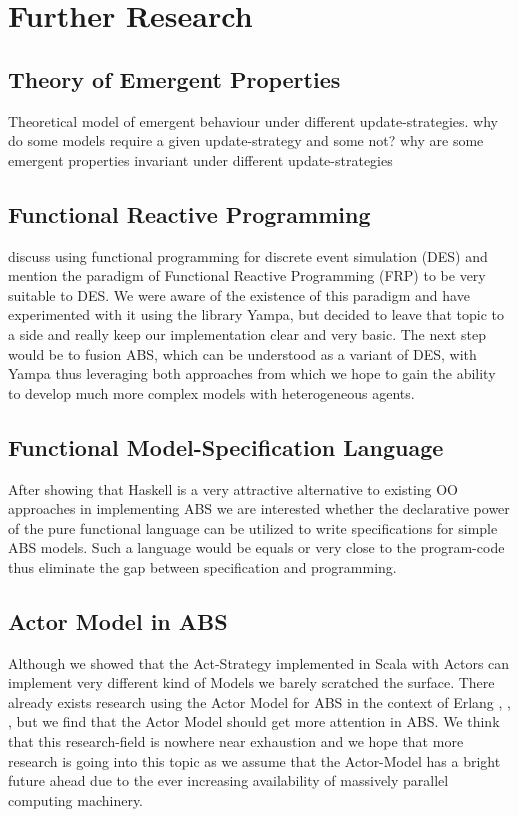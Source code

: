 \section{Further Research}

\subsection{Theory of Emergent Properties}
Theoretical model of emergent behaviour under different update-strategies. why do some models require a given update-strategy and some not? why are some emergent properties invariant under different update-strategies

\subsection{Functional Reactive Programming}
\cite{jankovic_functional_2007} discuss using functional programming for discrete event simulation (DES) and mention the paradigm of Functional Reactive Programming (FRP) to be very suitable to DES. We were aware of the existence of this paradigm and have experimented with it using the library Yampa, but decided to leave that topic to a side and really keep our implementation clear and very basic. The next step would be to fusion ABS, which can be understood as a variant of DES, with Yampa thus leveraging both approaches from which we hope to gain the ability to develop much more complex models with heterogeneous agents.

\subsection{Functional Model-Specification Language}
After showing that Haskell is a very attractive alternative to existing OO approaches in implementing ABS we are interested whether the declarative power of the pure functional language can be utilized to write specifications for simple ABS models. Such a language would be equals or very close to the program-code thus eliminate the gap between specification and programming.

\subsection{Actor Model in ABS}
Although we showed that the Act-Strategy implemented in Scala with Actors can implement very different kind of Models we barely scratched the surface. There already exists research using the Actor Model for ABS in the context of Erlang \cite{varela_modelling_2004}, \cite{di_stefano_using_2005}, \cite{di_stefano_exat:_2007}, \cite{sher_agent-based_2013} but we find that the Actor Model should get more attention in ABS. We think that this research-field is nowhere near exhaustion and we hope that more research is going into this topic as we assume that the Actor-Model has a bright future ahead due to the ever increasing availability of massively parallel computing machinery.